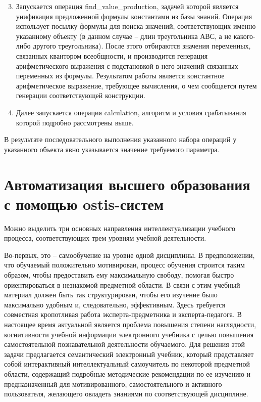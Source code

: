 \begin{enumerate}
	\setcounter{enumi}{2}
	\item
	Запускается операция find\_value\_production, задачей которой является унификация предложенной формулы константами из базы знаний. Операция использует посылку формулы для поиска значений, соответствующих именно указанному объекту (в данном случае -- длин треугольника АВС, а не какого-либо другого треугольника). После этого отбираются значения переменных, связанных квантором всеобщности, и производится генерация арифметического выражения с подстановкой в него значений связанных переменных из формулы. Результатом работы является константное арифметическое выражение, требующее вычисления, о чем сообщается путем генерации соответствующей конструкции.
	\item
	Далее запускается операция calculation, алгоритм и условия срабатывания которой подробно рассмотрены выше.
\end{enumerate}

В результате последовательного выполнения указанного набора операций у указанного объекта явно указывается значение требуемого параметра.

\section{Автоматизация высшего образования с помощью ostis-систем}

Можно выделить три основных направления интеллектуализации учебного процесса, соответствующих трем уровням учебной деятельности.

Во-первых, это -- самообучение на уровне одной дисциплины. В предположении, что обучаемый положительно мотивирован, процесс обучения строится таким образом, чтобы предоставить ему максимальную свободу, помогая быстро ориентироваться в незнакомой предметной области. В связи с этим учебный материал должен быть так структурирован, чтобы его изучение было максимально удобным и, следовательно, эффективным. Здесь требуется совместная кропотливая работа эксперта-предметника и эксперта-педагога. В настоящее время актуальной является проблема повышения степени наглядности, когнитивности учебной информации электронного учебника с целью повышения самостоятельной познавательной деятельности обучаемого. Для решения этой задачи предлагается семантический электронный учебник, который представляет собой интерактивный интеллектуальный самоучитель по некоторой предметной области, содержащий подробные методические рекомендации по ее изучению и предназначенный для мотивированного, самостоятельного и активного пользователя, желающего овладеть знаниями по соответствующей дисциплине.

